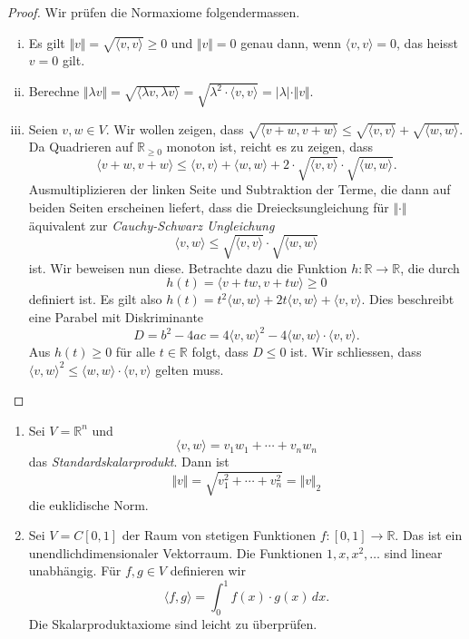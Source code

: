\documentclass[../main.tex]{subfiles}
\begin{document}
\begin{proof}
  Wir prüfen die Normaxiome folgendermassen.
  \begin{enumerate}[(i)]
    \item Es gilt $\Vert v \Vert = \sqrt{\langle v, v \rangle} \geq 0$
      und $\Vert v \Vert = 0$ genau dann, wenn
      $\langle v, v \rangle = 0$, das heisst $v = 0$ gilt.
    \item Berechne $\Vert \lambda v \Vert = \sqrt{\langle \lambda v,
      \lambda v\rangle}
      = \sqrt{\lambda^2 \cdot \langle v, v \rangle} = |\lambda| \cdot
      \Vert v \Vert$.
    \item Seien $v, w \in V$. Wir wollen zeigen, dass
      $\sqrt{\langle v + w, v + w \rangle} \leq
      \sqrt{\langle v, v \rangle} + \sqrt{\langle w, w \rangle}$.
      Da Quadrieren auf $\mathbb{R}_{\geq 0}$ monoton ist,
      reicht es zu zeigen, dass
      \[
      \langle v + w, v+ w \rangle\leq \langle v, v \rangle
      + \langle w, w \rangle + 2 \cdot \sqrt{\langle v, v \rangle} \cdot
      \sqrt{\langle w, w \rangle}.
      \]
      Ausmultiplizieren der linken Seite und Subtraktion der Terme,
      die dann auf beiden Seiten erscheinen liefert, dass
      die Dreiecksungleichung für $\Vert \cdot \Vert$ äquivalent
      zur \emph{Cauchy-Schwarz Ungleichung}
      \[
        \langle v, w \rangle \leq \sqrt{\langle v, v \rangle}
        \cdot \sqrt{\langle w, w \rangle}
      \]
      ist.
      Wir beweisen nun diese.
      Betrachte dazu die Funktion $h \colon \mathbb{R} \to \mathbb{R}$,
      die durch
      \[
        h(t) = \langle v + tw, v + tw \rangle \geq 0
      \]
      definiert ist.
      Es gilt also $h(t) = t^2 \langle w, w \rangle + 2t \langle v, w \rangle
      + \langle v, v \rangle$.
      Dies beschreibt eine Parabel mit Diskriminante
      \[
        D = b^2 - 4ac = 4\langle v, w \rangle^2 - 4\langle w, w \rangle
        \cdot \langle v, v \rangle.
      \]
      Aus $h(t) \geq 0$ für alle $t \in \mathbb{R}$ folgt, dass
      $D \leq 0$ ist.
      Wir schliessen, dass $\langle v, w \rangle^2 \leq \langle w, w \rangle
      \cdot \langle v, v \rangle$ gelten muss.
      \qedhere
  \end{enumerate}
\end{proof}

\begin{examples}
  \leavevmode
  \begin{enumerate}[(1)]
    \item Sei $V = \mathbb{R}^n$ und
      \[
        \langle v, w \rangle = v_1 w_1 + \cdots + v_n w_n
      \]
      das \emph{Standardskalarprodukt}.
      Dann ist
      \[
        \Vert v \Vert = \sqrt{v_1^2 + \cdots + v_n^2} = \Vert v \Vert_2
      \]
      die euklidische Norm.
    \item Sei $V = C[0, 1]$ der Raum von stetigen Funktionen
      $f \colon[0, 1] \to \mathbb{R}$.
      Das ist ein unendlichdimensionaler Vektorraum.
      Die Funktionen $1, x, x^2, \dots$ sind linear unabhängig.
      Für $f, g \in V$ definieren wir
      \[
        \langle f, g \rangle = \int_{0}^{1} f(x) \cdot g(x) \, dx.
      \]
      Die Skalarproduktaxiome sind leicht zu überprüfen.
  \end{enumerate}
\end{examples}
\end{document}
